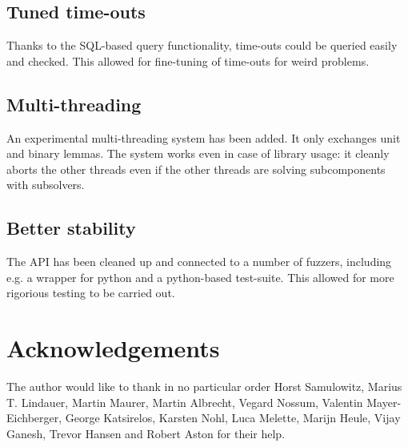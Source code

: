\documentclass[final]{ieee}
\begin{document}
\subsection{Tuned time-outs}
Thanks to the SQL-based query functionality, time-outs could be queried easily and checked. This allowed for fine-tuning of time-outs for weird problems.

\subsection{Multi-threading}
An experimental multi-threading system has been added. It only exchanges unit and binary lemmas. The system works even in case of library usage: it cleanly aborts the other threads even if the other threads are solving subcomponents with subsolvers.

\subsection{Better stability}
The API has been cleaned up and connected to a number of fuzzers, including e.g. a wrapper for python and a python-based test-suite. This allowed for more rigorious testing to be carried out.

\section*{Acknowledgements}
The author would like to thank in no particular order Horst Samulowitz, Marius T. Lindauer, Martin Maurer, Martin Albrecht, Vegard Nossum, Valentin Mayer-Eichberger, George Katsirelos, Karsten Nohl, Luca Melette, Marijn Heule, Vijay Ganesh, Trevor Hansen and Robert Aston for their help.




\vfill
\pagebreak
\end{document}
